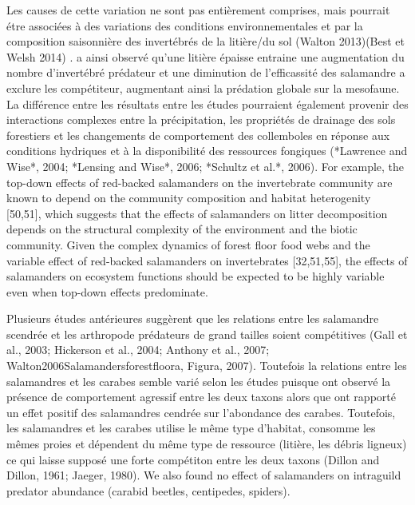 Les causes de cette variation ne sont pas entièrement comprises, mais pourrait étre associées à des variations des conditions environnementales et par la composition saisonnière des invertébrés de la litière/du sol (Walton 2013)(Best et Welsh 2014) \citep{Hickerson2012Interactionsforestfloor}.
\cite{Walton2013Topregulationlitter} a ainsi observé qu'une litière épaisse entraine une augmentation du nombre d'invertébré prédateur et une diminution de l'efficassité des salamandre a exclure les compétiteur, augmentant ainsi la prédation globale sur la mesofaune. 
La différence entre les résultats entre les études pourraient également provenir des interactions complexes entre la précipitation, les propriétés de drainage des sols forestiers et les changements de comportement des collemboles en réponse aux conditions hydriques et à la disponibilité des ressources fongiques (*Lawrence and Wise*, 2004; *Lensing and Wise*, 2006; *Schultz et al.*, 2006).
For example, the top-down effects of red-backed salamanders on the invertebrate community are known to depend on the community composition and habitat heterogenity [50,51], which suggests that the effects of salamanders on litter decomposition depends on the structural complexity of the environment and the biotic community.
Given the complex dynamics of forest floor food webs and the variable effect of red-backed salamanders on invertebrates [32,51,55], the effects of salamanders on ecosystem functions should be expected to be highly variable even when top-down effects predominate.



Plusieurs études antérieures suggèrent que les relations entre les salamandre scendrée et les arthropode prédateurs de grand tailles soient compétitives (Gall et al., 2003; Hickerson et al., 2004; Anthony et al., 2007; Walton2006Salamandersforestfloora, Figura, 2007).
Toutefois la relations entre les salamandres et les carabes semble varié selon les études 
puisque \cite{Gall2003BehavioralInteractionsa} ont observé la présence de comportement agressif entre les deux taxons 
alors que \cite{Hickerson2012Interactionsforestfloor} ont rapporté un effet positif des salamandres cendrée sur l'abondance des carabes.
Toutefois, les salamandres et les carabes utilise le même type d'habitat, consomme les mêmes proies et dépendent du même type de ressource (litière, les débris ligneux) ce qui laisse supposé une forte compétiton entre les deux taxons (Dillon and Dillon, 1961; Jaeger, 1980). 
We also found no effect of salamanders on intraguild predator abundance (carabid beetles, centipedes, spiders).



